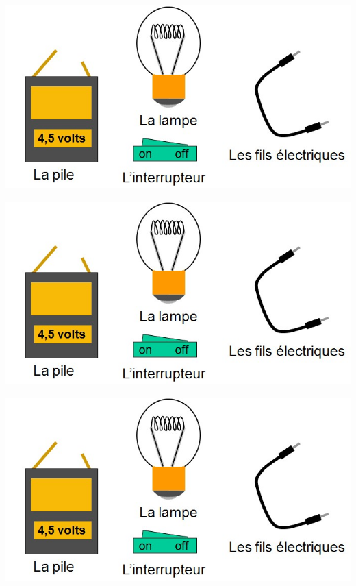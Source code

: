 \documentclass[12pt,a4paper]{article}
\begin{document}
\begin{multicols}{2}
\begin{center}
	\includegraphics[scale=0.45]{img/dipoles}
\end{center}

\begin{center}
	\includegraphics[scale=0.45]{img/dipoles}
\end{center}

\begin{center}
	\includegraphics[scale=0.45]{img/dipoles}
\end{center}


\end{multicols}
\end{document}
